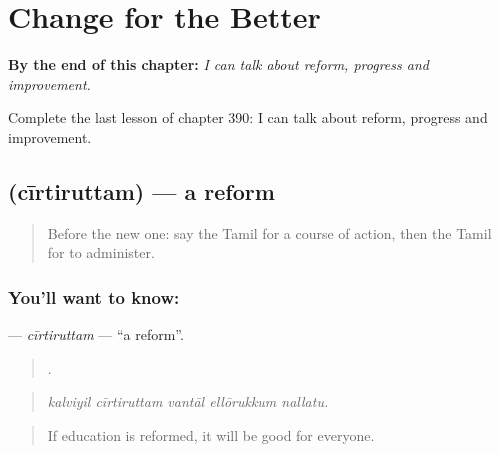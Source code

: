 
\chapter{Change for the Better}
\label{ch:ta-change-for-the-better}

\begin{chapteropening}
\textbf{By the end of this chapter:} \emph{I can talk about reform, progress and improvement.}

Complete the last lesson of chapter 390: I can talk about reform, progress and improvement.
\end{chapteropening}

\section[\texorpdfstring{\ta{சீர்திருத்தம்} (cīrtiruttam)}{சீர்திருத்தம் (cīrtiruttam)}]{ (cīrtiruttam) — a reform}

\label{lesson:TA-C390-cirtiruttam}



\begin{quote}
Before the new one: say the Tamil for a course of action, then the Tamil for to administer.
\end{quote}

\subsection*{You'll want to know: }
\textbf{} — \emph{cīrtiruttam} — \textquotedblleft{}a reform\textquotedblright{}.

\begin{quote}
    .
\end{quote}

\begin{quote}
\emph{kalviyil cīrtiruttam vantāl ellōrukkum nallatu.}
\end{quote}

\begin{quote}
If education is reformed, it will be good for everyone.
\end{quote}

